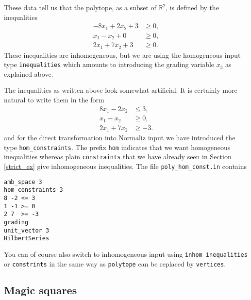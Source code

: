 \documentclass[12pt,a4paper]{scrartcl}
\theoremstyle{definition}
\def\RR{{\mathbb R}}
\begin{document}
These data tell us that the polytope, as a subset of $\RR^2$, is defined by the inequalities
\begin{align*}
-8x_1+2x_2+3&\ge0,\\
x_1-x_2+0&\ge0,\\
2x_1+7x_2+3&\ge 0.
\end{align*}
These inequalities are inhomogeneous, but we are using the homogeneous input type \verb|inequalities| which amounts to introducing the grading variable $x_3$ as explained above.


The inequalities as written above look somewhat artificial. It is certainly more natural to write them in the form
\begin{align*}
8x_1-2x_2&\le 3,\\
x_1-x_2&\ge0,\\
2x_1+7x_2&\ge -3.
\end{align*}
and for the direct transformation into Normaliz input we have introduced the type \verb|hom_constraints|. The prefix \verb|hom| indicates that we want homogeneous inequalities whereas plain \verb|constraints|  that we have already seen in Section \ref{strict_ex} give inhomogeneous inequalities. The file \verb|poly_hom_const.in| contains
\begin{Verbatim}
amb_space 3
hom_constraints 3
8 -2 <= 3
1 -1 >= 0
2 7  >= -3
grading
unit_vector 3
HilbertSeries
\end{Verbatim}

You can of course also switch to inhomogeneous input using \verb|inhom_inequalities| or \verb|constrints| in the same way as \verb|polytope| can be replaced by \verb|vertices|.

\subsection{Magic squares}\label{eq_ex}
\end{document}
